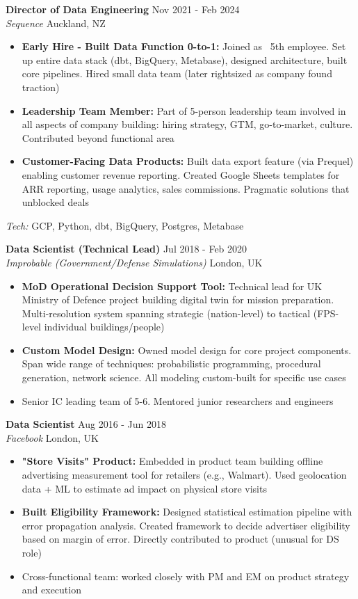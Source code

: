 \documentclass[10pt,a4paper]{article}
\newcommand{\cventry}[5]{
    \textbf{#1} \hfill {\small\color{darkgray} #2} \\
    {\color{accentcolor}\textit{#3}} \hfill {\small\color{darkgray} #4} \\
    #5
    \vspace{6pt}
}
\begin{document}
\cventry
    {Director of Data Engineering}
    {Nov 2021 - Feb 2024}
    {Sequence}
    {Auckland, NZ}
    {
    \begin{itemize}[leftmargin=*, itemsep=1pt, parsep=0pt, topsep=2pt]
        \item \textbf{Early Hire - Built Data Function 0-to-1:} Joined as ~5th employee. Set up entire data stack (dbt, BigQuery, Metabase), designed architecture, built core pipelines. Hired small data team (later rightsized as company found traction)
        \item \textbf{Leadership Team Member:} Part of 5-person leadership team involved in all aspects of company building: hiring strategy, GTM, go-to-market, culture. Contributed beyond functional area
        \item \textbf{Customer-Facing Data Products:} Built data export feature (via Prequel) enabling customer revenue reporting. Created Google Sheets templates for ARR reporting, usage analytics, sales commissions. Pragmatic solutions that unblocked deals
    \end{itemize}
    \textit{Tech:} GCP, Python, dbt, BigQuery, Postgres, Metabase
    }

\cventry
    {Data Scientist (Technical Lead)}
    {Jul 2018 - Feb 2020}
    {Improbable (Government/Defense Simulations)}
    {London, UK}
    {
    \begin{itemize}[leftmargin=*, itemsep=1pt, parsep=0pt, topsep=2pt]
        \item \textbf{MoD Operational Decision Support Tool:} Technical lead for UK Ministry of Defence project building digital twin for mission preparation. Multi-resolution system spanning strategic (nation-level) to tactical (FPS-level individual buildings/people)
        \item \textbf{Custom Model Design:} Owned model design for core project components. Span wide range of techniques: probabilistic programming, procedural generation, network science. All modeling custom-built for specific use cases
        \item Senior IC leading team of 5-6. Mentored junior researchers and engineers
    \end{itemize}
    }

\cventry
    {Data Scientist}
    {Aug 2016 - Jun 2018}
    {Facebook}
    {London, UK}
    {
    \begin{itemize}[leftmargin=*, itemsep=1pt, parsep=0pt, topsep=2pt]
        \item \textbf{"Store Visits" Product:} Embedded in product team building offline advertising measurement tool for retailers (e.g., Walmart). Used geolocation data + ML to estimate ad impact on physical store visits
        \item \textbf{Built Eligibility Framework:} Designed statistical estimation pipeline with error propagation analysis. Created framework to decide advertiser eligibility based on margin of error. Directly contributed to product (unusual for DS role)
        \item Cross-functional team: worked closely with PM and EM on product strategy and execution
    \end{itemize}
    }
\end{document}
